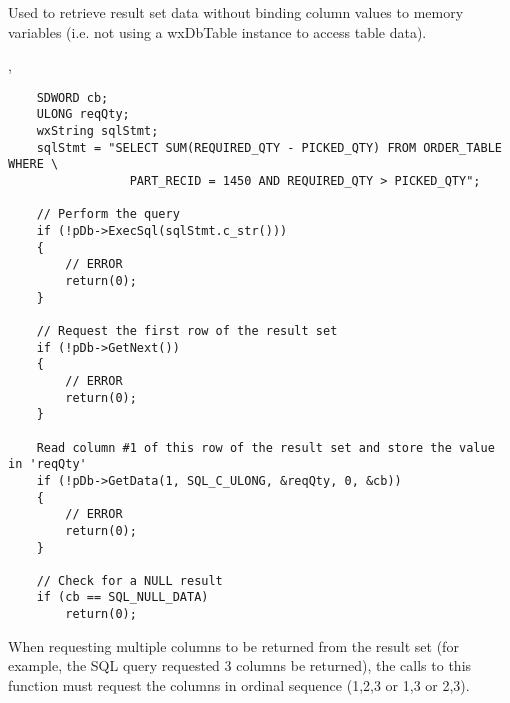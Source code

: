\label{wxdbgetdata}


Used to retrieve result set data without binding column values to memory variables (i.e. not using a wxDbTable instance to access table data).




, 


\begin{verbatim}
    SDWORD cb;
    ULONG reqQty;
    wxString sqlStmt;
    sqlStmt = "SELECT SUM(REQUIRED_QTY - PICKED_QTY) FROM ORDER_TABLE WHERE \
                 PART_RECID = 1450 AND REQUIRED_QTY > PICKED_QTY";

    // Perform the query
    if (!pDb->ExecSql(sqlStmt.c_str()))
    {
        // ERROR
        return(0);
    }

    // Request the first row of the result set
    if (!pDb->GetNext())
    {
        // ERROR
        return(0);
    }

    Read column #1 of this row of the result set and store the value in 'reqQty'
    if (!pDb->GetData(1, SQL_C_ULONG, &reqQty, 0, &cb))
    {
        // ERROR
        return(0);
    }

    // Check for a NULL result
    if (cb == SQL_NULL_DATA)
        return(0);
\end{verbatim}


When requesting multiple columns to be returned from the result set (for example, the SQL query
requested 3 columns be returned), the calls to this function must request the columns in ordinal
sequence (1,2,3 or 1,3 or 2,3).  

